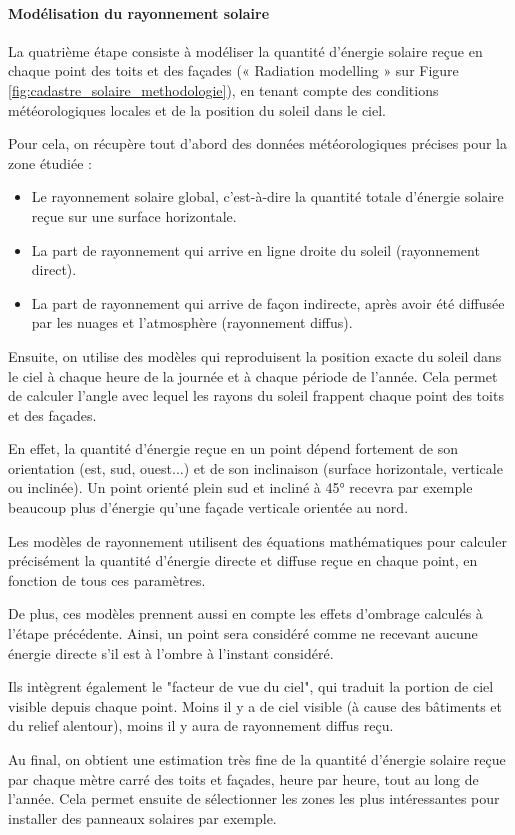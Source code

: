 \paragraph{Modélisation du rayonnement solaire}
\par{La quatrième étape consiste à modéliser la quantité d'énergie solaire reçue en chaque point des toits et des façades (« Radiation modelling » sur Figure \ref{fig:cadastre_solaire_methodologie}), en tenant compte des conditions météorologiques locales et de la position du soleil dans le ciel.}
\par{Pour cela, on récupère tout d'abord des données météorologiques précises pour la zone étudiée :
\begin{itemize}
\item Le rayonnement solaire global, c'est-à-dire la quantité totale d'énergie solaire reçue sur une surface horizontale.
\item La part de rayonnement qui arrive en ligne droite du soleil (rayonnement direct).
\item La part de rayonnement qui arrive de façon indirecte, après avoir été diffusée par les nuages et l'atmosphère (rayonnement diffus).
\end{itemize}}
\par{Ensuite, on utilise des modèles qui reproduisent la position exacte du soleil dans le ciel à chaque heure de la journée et à chaque période de l'année. Cela permet de calculer l'angle avec lequel les rayons du soleil frappent chaque point des toits et des façades.}
\par{En effet, la quantité d'énergie reçue en un point dépend fortement de son orientation (est, sud, ouest...) et de son inclinaison (surface horizontale, verticale ou inclinée). Un point orienté plein sud et incliné à 45° recevra par exemple beaucoup plus d'énergie qu'une façade verticale orientée au nord.}
\par{Les modèles de rayonnement utilisent des équations mathématiques pour calculer précisément la quantité d'énergie directe et diffuse reçue en chaque point, en fonction de tous ces paramètres.}
\par{De plus, ces modèles prennent aussi en compte les effets d'ombrage calculés à l'étape précédente. Ainsi, un point sera considéré comme ne recevant aucune énergie directe s'il est à l'ombre à l'instant considéré.}
\par{Ils intègrent également le "facteur de vue du ciel", qui traduit la portion de ciel visible depuis chaque point. Moins il y a de ciel visible (à cause des bâtiments et du relief alentour), moins il y aura de rayonnement diffus reçu.}
\par{Au final, on obtient une estimation très fine de la quantité d'énergie solaire reçue par chaque mètre carré des toits et façades, heure par heure, tout au long de l'année. Cela permet ensuite de sélectionner les zones les plus intéressantes pour installer des panneaux solaires par exemple.}

